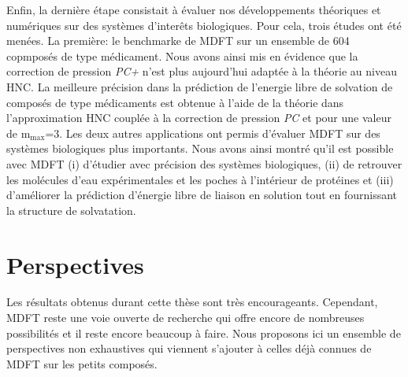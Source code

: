 Enfin, la dernière étape consistait à évaluer nos développements théoriques et numériques sur des systèmes d'interêts biologiques. Pour cela, trois études ont été menées. La première: le benchmarke de MDFT sur un ensemble de 604 copmposés de type médicament. Nous avons ainsi mis en évidence que la correction de pression \textit{PC+} n'est plus aujourd'hui adaptée à la théorie au niveau HNC. La meilleure précision dans la prédiction de l'energie libre de solvation de composés de type médicaments est obtenue à l'aide de la théorie dans l'approximation HNC couplée à la correction de pression \textit{PC} et pour une valeur de $\mathrm{m}_\mathrm{max}$=3.
Les deux autres applications ont permis d'évaluer MDFT sur des systèmes biologiques plus importants. Nous avons ainsi montré qu'il est possible avec MDFT (i) d’étudier avec précision des systèmes biologiques, (ii) de retrouver les molécules d’eau expérimentales et les poches à l’intérieur de protéines et (iii) d’améliorer la prédiction d’énergie libre de liaison en solution tout en fournissant la structure de solvatation. 







\chapter{Perspectives}
\label{chap:perspectives}
Les résultats obtenus durant cette thèse sont très encourageants. Cependant, MDFT reste une voie ouverte de recherche qui offre encore de nombreuses possibilités et il reste encore beaucoup à faire. Nous proposons ici un ensemble de perspectives non exhaustives qui viennent s'ajouter à celles déjà connues de MDFT sur les petits composés.

